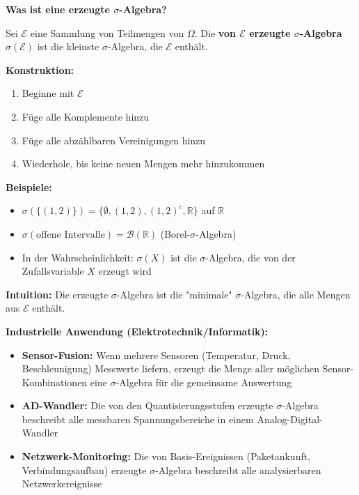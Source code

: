 \begin{denoobification}
\textbf{Was ist eine erzeugte $\sigma$-Algebra?}

Sei $\mathcal{E}$ eine Sammlung von Teilmengen von $\Omega$. Die \textbf{von $\mathcal{E}$ erzeugte $\sigma$-Algebra} $\sigma(\mathcal{E})$ ist die kleinste $\sigma$-Algebra, die $\mathcal{E}$ enthält.

\textbf{Konstruktion:}
\begin{enumerate}
    \item Beginne mit $\mathcal{E}$
    \item Füge alle Komplemente hinzu
    \item Füge alle abzählbaren Vereinigungen hinzu
    \item Wiederhole, bis keine neuen Mengen mehr hinzukommen
\end{enumerate}

\textbf{Beispiele:}
\begin{itemize}
    \item $\sigma(\{(1,2)\}) = \{\emptyset, (1,2), (1,2)^c, \mathbb{R}\}$ auf $\mathbb{R}$
    \item $\sigma(\text{offene Intervalle}) = \mathcal{B}(\mathbb{R})$ (Borel-$\sigma$-Algebra)
    \item In der Wahrscheinlichkeit: $\sigma(X)$ ist die $\sigma$-Algebra, die von der Zufallsvariable $X$ erzeugt wird
\end{itemize}

\textbf{Intuition:} Die erzeugte $\sigma$-Algebra ist die "minimale" $\sigma$-Algebra, die alle Mengen aus $\mathcal{E}$ enthält.

\textbf{Industrielle Anwendung (Elektrotechnik/Informatik):}
\begin{itemize}
    \item \textbf{Sensor-Fusion:} Wenn mehrere Sensoren (Temperatur, Druck, Beschleunigung) Messwerte liefern, erzeugt die Menge aller möglichen Sensor-Kombinationen eine $\sigma$-Algebra für die gemeinsame Auswertung
    \item \textbf{AD-Wandler:} Die von den Quantisierungsstufen erzeugte $\sigma$-Algebra beschreibt alle messbaren Spannungsbereiche in einem Analog-Digital-Wandler
    \item \textbf{Netzwerk-Monitoring:} Die von Basis-Ereignissen (Paketankunft, Verbindungsaufbau) erzeugte $\sigma$-Algebra beschreibt alle analysierbaren Netzwerkereignisse
\end{itemize}


\end{denoobification}
